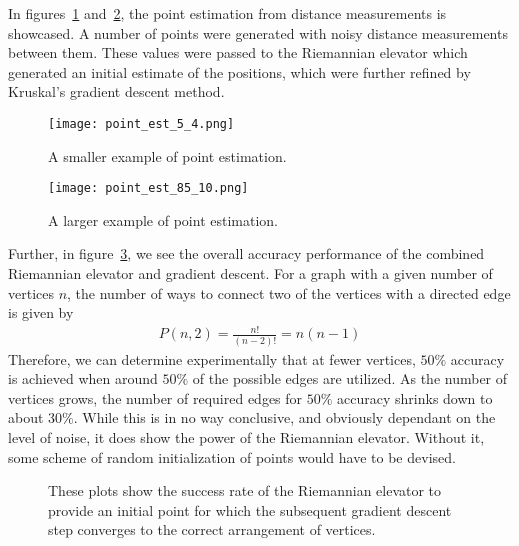 In figures~\ref{fig:point-est-small} and~\ref{fig:point-est-large}, the point estimation from distance measurements is showcased. A number of points were generated with noisy distance measurements between them. These values were passed to the Riemannian elevator which generated an initial estimate of the positions, which were further refined by Kruskal's gradient descent method.
\begin{figure}[ht]
    \centering
    \texttt{[image: point\_est\_5\_4.png]}
    \caption{A smaller example of point estimation.}
    \label{fig:point-est-small}
\end{figure}
\begin{figure}[ht]
    \centering
    \texttt{[image: point\_est\_85\_10.png]}
    \caption{A larger example of point estimation.}
    \label{fig:point-est-large}
\end{figure}
Further, in figure~\ref{fig:RE-accuracy}, we see the overall accuracy performance of the combined Riemannian elevator and gradient descent. For a graph with a given number of vertices $n$, the number of ways to connect two of the vertices with a directed edge is given by 
\begin{align}
    P(n, 2) = \frac{n!}{(n-2)!} = n (n-1)
\end{align}
Therefore, we can determine experimentally that at fewer vertices, $50\%$ accuracy is achieved when around $50\%$ of the possible edges are utilized. As the number of vertices grows, the number of required edges for $50\%$ accuracy shrinks down to about $30\%$. While this is in no way conclusive, and obviously dependant on the level of noise, it does show the power of the Riemannian elevator. Without it, some scheme of random initialization of points would have to be devised.
\begin{figure}[ht]
    \centering
    
    \caption{These plots show the success rate of the Riemannian elevator to provide an initial point for which the subsequent gradient descent step converges to the correct arrangement of vertices.}
    \label{fig:RE-accuracy}
\end{figure}
